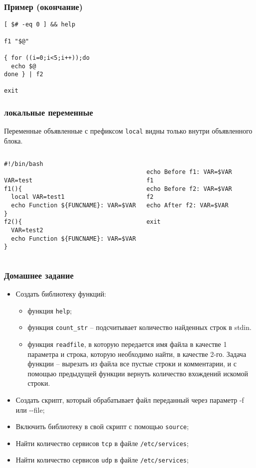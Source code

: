 \begin{frame}[fragile]
	\frametitle{Пример (окончание)}
	\small
	\begin{lstlisting}
[ $# -eq 0 ] && help

f1 "$@"

{ for ((i=0;i<5;i++));do
  echo $@
done } | f2

exit
	\end{lstlisting}

\end{frame}

\begin{frame}[fragile]
	\frametitle{локальные переменные}

	Переменные объявленные с префиксом {\tt local} видны только внутри объявленного блока.

	\small
	\begin{columns}
		\begin{lstlisting}
#!/bin/bash

VAR=test
f1(){
  local VAR=test1
  echo Function ${FUNCNAME}: VAR=$VAR
}
f2(){
  VAR=test2
  echo Function ${FUNCNAME}: VAR=$VAR
}
		\end{lstlisting}
		\begin{lstlisting}

echo Before f1: VAR=$VAR
f1
echo Before f2: VAR=$VAR
f2
echo After f2: VAR=$VAR

exit
		\end{lstlisting}
	\end{columns}

\end{frame}

\begin{frame}
	\frametitle{Домашнее задание}
	\begin{itemize}
		\item Создать библиотеку функций:
			\begin{itemize}
				\item функция {\tt help};
				\item функция {\tt count\_str} -- подсчитывает количество найденных строк в stdin.
				\item функция {\tt readfile}, в которую передается имя файла в качестве 1 параметра
					и строка, которую необходимо найти, в качестве 2-го.
					Задача функции -- вырезать из файла все пустые строки и комментарии, 
					и с помощью предыдущей функции вернуть количество вхождений искомой строки.
			\end{itemize}
		\item Создать скрипт, который обрабатывает файл переданный через параметр -f или -{}-file;
		\item Включить библиотеку в свой скрипт с помощью {\tt source};
		\item Найти количество сервисов {\tt tcp} в файле {\tt /etc/services};
		\item Найти количество сервисов {\tt udp} в файле {\tt /etc/services};
  \end{itemize}
\end{frame}

